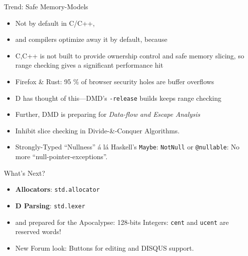 \documentclass[xcolor=dvipsnames]{beamer}
\begin{document}
\begin{frame}[fragile]{Trend: Safe Memory-Models}
  \begin{itemize}[<+->]
  \item Not by default in C/C++,
  \item and compilers optimize away it by default, because
  \item C,C++ is not built to provide ownership control and safe
    memory slicing, so range checking gives a significant performance hit
  \item Firefox \& Rust: 95 \% of browser security holes are buffer overflows
  \item D has thought of this---DMD's \texttt{-release} builds keeps range
    checking %
  \item Further, DMD is preparing for \emph{Data-flow and Escape Analysis}
  \item Inhibit slice checking in Divide-\&-Conquer
    Algorithms. %
  \item Strongly-Typed ``Nullness'' á lá Haskell's \texttt{Maybe}: \texttt{NotNull} or
    \texttt{@nullable}: No more ``null-pointer-exceptions''.
  \end{itemize}
\end{frame}

\begin{frame}[fragile]{What's Next?}
  \begin{itemize}[<+->]
  \item \textbf{Allocators}: \texttt{std.allocator}
  \item \textbf{D Parsing}: \texttt{std.lexer}
  \item and prepared for the Apocalypse: 128-bits Integers: \texttt{cent} and
    \texttt{ucent} are reserved words!
  \item New Forum look: Buttons for editing and DISQUS support.
  \end{itemize}
\end{frame}
\end{document}
